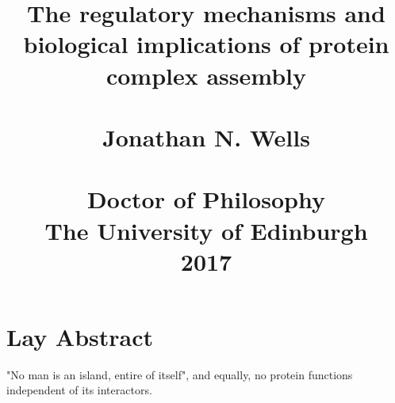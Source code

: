 \documentclass[a4paper,11pt,twoside,openright]{book}
\begin{document}
\title{The regulatory mechanisms and biological implications of protein complex assembly \\~\\
\normalsize
Jonathan N. Wells \\~\\
Doctor of Philosophy \\
The University of Edinburgh \\
2017}
\date{}

\maketitle




\chapter*{Lay Abstract}
"No man is an island, entire of itself", and equally, no protein functions independent of its interactors.





\printbibliography
\end{document}
